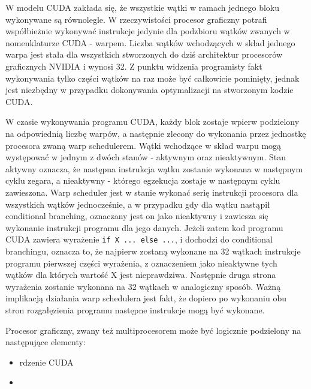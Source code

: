 W modelu CUDA zakłada się, że wszystkie wątki w ramach jednego bloku wykonywane
są równolegle. W rzeczywistości procesor graficzny potrafi współbieżnie wykonywać
instrukcje jedynie dla podzbioru wątków zwanych w nomenklaturze CUDA - warpem. 
Liczba wątków wchodzących w skład jednego warpa jest stała dla wszystkich stworzonych
do dziś architektur procesorów graficznych NVIDIA i wynosi 32. Z punktu
widzenia programisty fakt wykonywania tylko części wątków na raz może być
całkowicie pominięty, jednak jest niezbędny w przypadku dokonywania
optymalizacji na stworzonym kodzie CUDA\cite{kepler}.

W czasie wykonywania programu CUDA, każdy blok zostaje wpierw podzielony na odpowiednią
liczbę warpów, a następnie zlecony do wykonania przez jednostkę procesora zwaną warp
schedulerem. Wątki wchodzące w skład warpu mogą występować w jednym z dwóch stanów
- aktywnym oraz nieaktywnym. Stan aktywny oznacza, że następna instrukcja wątku zostanie wykonana w następnym
cyklu zegara, a nieaktywny - którego egzekucja zostaje w następnym cyklu
zawieszona. Warp scheduler jest w stanie wykonać serię instrukcji
procesora dla wszystkich wątków jednocześnie, a w przypadku gdy dla wątku
nastąpił conditional branching, oznaczany jest on jako nieaktywny i
zawiesza się wykonanie instrukcji programu dla jego danych. Jeżeli zatem kod
programu CUDA
zawiera wyrażenie \texttt{if X {...} else {...}}, i dochodzi do conditional
branchingu, oznacza to, że najpierw zostaną
wykonane na 32 wątkach instrukcje programu pierwszej części wyrażenia,
		 z oznaczeniem jako nieaktywne tych wątków dla których wartość X jest
		 nieprawdziwa. Następnie druga strona wyrażenia zostanie wykonana na 32
		 wątkach w analogiczny sposób. Ważną implikacją działania warp
		 schedulera jest fakt, że dopiero po wykonaniu obu stron rozgałęzienia
		 programu następne instrukcje mogą być wykonane.


Procesor graficzny, zwany też multiprocesorem może być logicznie
podzielony na następujące elementy:
\begin{itemize}
\item rdzenie CUDA
\item 
\end{itemize}

